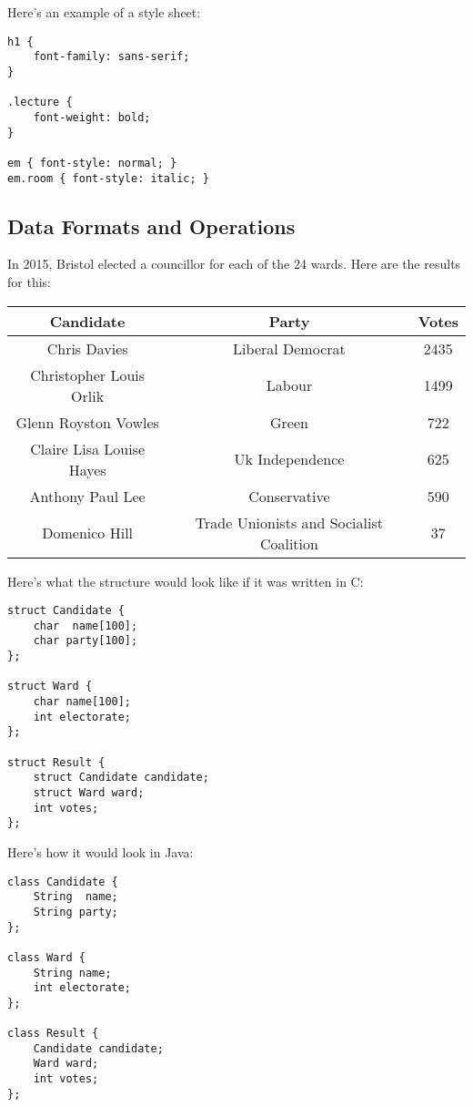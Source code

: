 \documentclass[11pt,a4paper,titlepage,dvipsnames,cmyk]{scrartcl}
\begin{document}
Here's an example of a style sheet:
\begin{lstlisting}[style=B ]
h1 {
    font-family: sans-serif;
}

.lecture {
    font-weight: bold;
}

em { font-style: normal; }
em.room { font-style: italic; }
\end{lstlisting}

\subsection{Data Formats and Operations}%
\label{sub:Data Formats and Operations}
In 2015, Bristol elected a councillor for each of the 24 wards. Here are
the results for this:
\begin{center}
    \begin{tabular}{|c|c|c|}
        \hline
        \textbf{Candidate} & \textbf{Party} & \textbf{Votes} \\
        \hline
        Chris Davies & Liberal Democrat & 2435 \\
        \hline
        Christopher Louis Orlik & Labour & 1499 \\
        \hline
        Glenn Royston Vowles & Green & 722 \\
        \hline
        Claire Lisa Louise Hayes & Uk Independence & 625 \\
        \hline
        Anthony Paul Lee & Conservative & 590 \\
        \hline
        Domenico Hill & Trade Unionists and Socialist Coalition & 37 \\
        \hline
    \end{tabular}
\end{center}

Here's what the structure would look like if it was written in C:
\begin{lstlisting}[style=B]
struct Candidate {
    char  name[100];
    char party[100];
};

struct Ward {
    char name[100];
    int electorate;
};

struct Result {
    struct Candidate candidate;
    struct Ward ward;
    int votes;
};
\end{lstlisting}

Here's how it would look in Java:
\begin{lstlisting}[style=B]
class Candidate {
    String  name;
    String party;
};

class Ward {
    String name;
    int electorate;
};

class Result {
    Candidate candidate;
    Ward ward;
    int votes;
};
\end{lstlisting}
\end{document}
